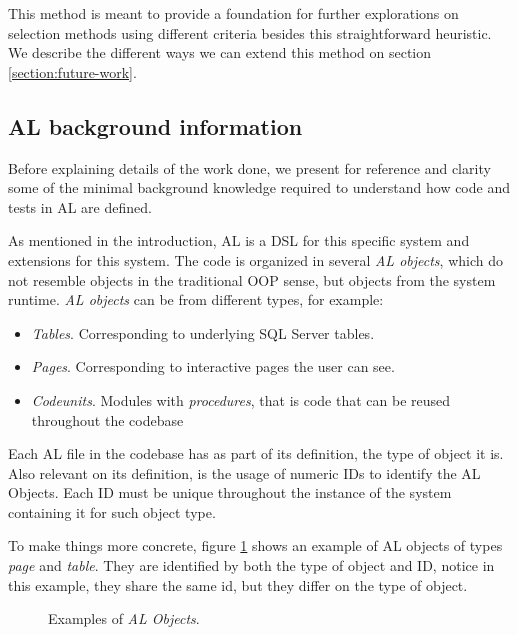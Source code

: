 \documentclass{article}
\begin{document}
This method is meant to provide a foundation for further explorations on selection methods using different criteria besides this straightforward heuristic. We describe the different ways we can extend this method on section \ref{section:future-work}.
\subsection{AL background information}\label{section:al-background-info}
Before explaining details of the work done, we present for reference and clarity some of the minimal background knowledge required to understand how code and tests in AL are defined.

As mentioned in the introduction, AL is a DSL for this specific system and extensions for this system. The code is organized in several \emph{AL objects}, which do not resemble objects in the traditional OOP sense, but objects from the system runtime. \emph{AL objects} can be from different types, for example:
\begin{itemize}
\item \emph{Tables}. Corresponding to underlying SQL Server tables.
\item \emph{Pages}. Corresponding to interactive pages the user can see.
\item \emph{Codeunits}. Modules with \emph{procedures}, that is code that can be reused throughout the codebase
\end{itemize}

Each AL file in the codebase has as part of its definition, the type of object it is. Also relevant on its definition, is the usage of numeric IDs to identify the AL Objects. Each ID must be unique throughout the instance of the system containing it for such object type.

To make things more concrete, figure \ref{fig:al-examples} shows an example of AL objects of types \emph{page} and \emph{table}. They are identified by both the type of object and ID, notice in this example, they share the same id, but they differ on the type of object.
\begin{figure}[H]
  \centering
  \qquad
  \caption{Examples of \emph{AL Objects}. }
  \label{fig:al-examples}
\end{figure}
\end{document}
